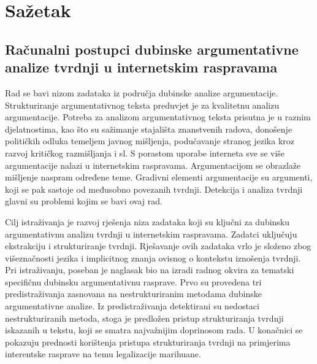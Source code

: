 \section*{Sažetak}

\subsection*{Računalni postupci dubinske argumentativne analize tvrdnji u internetskim raspravama}

Rad se bavi nizom zadataka iz područja dubinske analize argumentacije. 
Strukturiranje argumentativnog teksta 
preduvjet je za kvalitetnu analizu argumentacije. 
Potreba za analizom argumentativnog teksta prisutna je u raznim djelatnostima, 
kao što su sažimanje stajališta znanstvenih radova, 
donošenje političkih odluka temeljem javnog mišljenja, 
podučavanje stranog jezika kroz razvoj kritičkog razmišljanja 
i sl. S porastom uporabe interneta sve se više argumentacije nalazi u
internetskim raspravama. Argumentacijom se obrazlaže mišljenje naspram
određene teme. Gradivni elementi argumentacije su argumenti, koji se pak sastoje
od međusobno povezanih tvrdnji. Detekcija i analiza tvrdnji glavni su problemi kojim se
bavi ovaj rad. 

Cilj istraživanja je razvoj rješenja niza zadataka koji su ključni za dubinsku
argumentativnu analizu tvrdnji u internetskim raspravama.  Zadatci uključuju
ekstrakciju i strukturiranje tvrdnji. Rješavanje ovih zadataka vrlo je složeno
zbog višeznačnosti jezika i implicitnog znanja ovisnog o kontekstu iznošenja
tvrdnji. Pri istraživanju, poseban je naglasak bio na izradi radnog okvira za
tematski specifičnu dubinsku argumentativnu rasprave.  Prvo su provedena tri
predistraživanja zasnovana na nestrukturiranim metodama dubinske argumentativne
analize. Iz predistraživanja detektirani su nedostaci nestrukturiranih metoda,
stoga je predložen pristup strukturiranja tvrdnji iskazanih u tekstu, koji se
smatra najvažnijim doprinosom rada. U konačnici se pokazuju 
prednosti korištenja pristupa strukturiranja tvrdnji na primjerima interentske rasprave
na temu legalizacije marihuane. 

